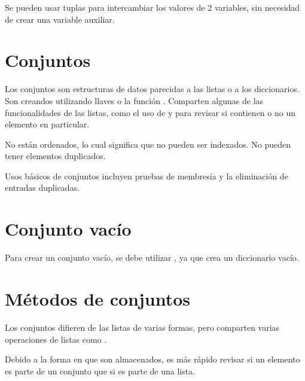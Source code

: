 
Se pueden usar tuplas para intercambiar los valores de 2 variables, sin necesidad de crear una variable auxiliar.


\section{Conjuntos}

Los conjuntos son estructuras de datos parecidas a las listas o a los diccionarios.
Son creandos utilizando llaves \ttt{\{\}}o la función .
Comparten algunas de las funcionalidades de las listas, como el uso de  y  para revisar si contienen o no un elemento en particular.


No están ordenados, lo cual significa que no pueden ser indexados.
No pueden tener elementos duplicados.


Usos básicos de conjuntos incluyen pruebas de membresía y la eliminación de entradas duplicadas.

\section{Conjunto vacío}

Para crear un conjunto vacío, se debe utilizar , ya que \ttt{\{\}} crea un diccionario vacío.


\section{Métodos de conjuntos}

Los conjuntos difieren de las listas de varias formas, pero comparten varias operaciones de listas como .


Debido a la forma en que son almacenados, es más rápido revisar si un elemento es parte de un conjunto que si es parte de una lista.
\medskip

